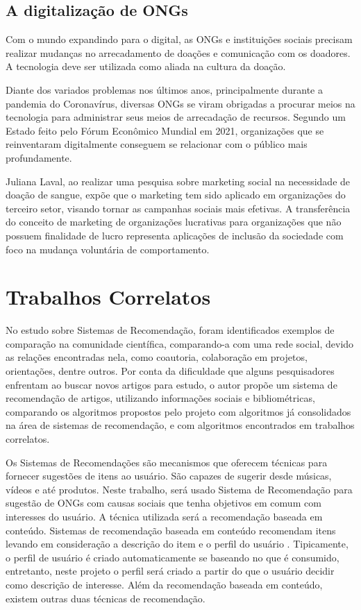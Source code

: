 \documentclass[conference]{IEEEtran}
\begin{document}
\subsection{A digitalização de ONGs}
Com o mundo expandindo para o digital, as ONGs e instituições sociais precisam realizar mudanças no arrecadamento de doações e comunicação com os doadores. A tecnologia deve ser utilizada como aliada na cultura da doação. 

Diante dos variados problemas nos últimos anos, principalmente durante a pandemia do Coronavírus, diversas ONGs se viram obrigadas a procurar meios na tecnologia para administrar seus meios de arrecadação de recursos. Segundo um Estado feito pelo Fórum Econômico Mundial em 2021, organizações que se reinventaram digitalmente conseguem se relacionar com o público mais profundamente. \cite{siteimpacto} \cite{economicforum}

Juliana Laval, ao realizar uma pesquisa sobre marketing social na necessidade de doação de sangue, expõe que o marketing tem sido aplicado em organizações do terceiro setor, visando tornar as campanhas sociais mais efetivas. A transferência do conceito de marketing de organizações lucrativas para organizações que não possuem finalidade de lucro representa aplicações de inclusão da sociedade com foco na mudança voluntária de comportamento. \cite{laval2007comportamento}


\section{Trabalhos Correlatos}

No estudo sobre Sistemas de Recomendação, foram identificados exemplos de comparação na comunidade científica, comparando-a com uma rede social, devido as relações encontradas nela, como coautoria, colaboração em projetos, orientações, dentre outros. Por conta da dificuldade que alguns pesquisadores enfrentam ao buscar novos artigos para estudo, o autor propõe um sistema de recomendação de artigos, utilizando informações sociais e bibliométricas, comparando os algoritmos propostos pelo projeto com algoritmos já consolidados na área de sistemas de recomendação, e com algoritmos encontrados em trabalhos correlatos.  \cite{grava2021sistema}

Os Sistemas de Recomendações são mecanismos que oferecem técnicas para fornecer sugestões de itens ao usuário. São capazes de sugerir desde músicas, vídeos e até produtos. Neste trabalho, será usado Sistema de Recomendação para sugestão de ONGs com causas sociais que tenha objetivos em comum com interesses do usuário. A técnica utilizada será a recomendação baseada em conteúdo. Sistemas de recomendação baseada em conteúdo recomendam itens levando em consideração a descrição do item e o perfil do usuário \cite{sharma2013survey}. Tipicamente, o perfil de usuário é criado automaticamente se baseando no que é consumido, entretanto, neste projeto o perfil será criado a partir do que o usuário decidir como descrição de interesse. Além da recomendação baseada em conteúdo, existem outras duas técnicas de recomendação. 
\end{document}
